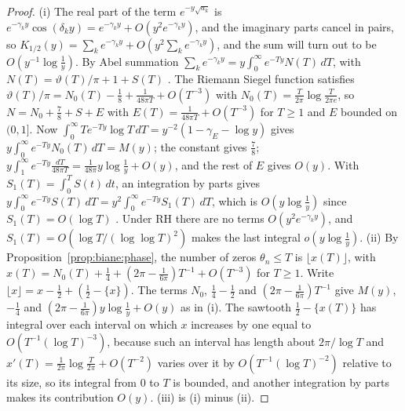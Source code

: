\begin{proof}
(i) The real part of the term $e^{-y\sqrt{a_k}}$ is $e^{-\gamma_ky}\cos(\delta_ky)=e^{-\gamma_ky}+O(y^2e^{-\gamma_ky})$, and the imaginary parts cancel in pairs, so $K_{1/2}(y)=\sum_ke^{-\gamma_ky}+O(y^2\sum_ke^{-\gamma_ky})$, and the sum will turn out to be $O(y^{-1}\log\frac1y)$. By Abel summation $\sum_ke^{-\gamma_ky}=y\int_0^\infty e^{-Ty}N(T)\,dT$, with $N(T)=\vartheta(T)/\pi+1+S(T)$ \cite[Section 9.3]{Titchmarsh}. The Riemann Siegel function satisfies $\vartheta(T)/\pi=N_0(T)-\frac18+\frac1{48\pi T}+O(T^{-3})$ with $N_0(T)=\frac T{2\pi}\log\frac T{2\pi e}$, so $N=N_0+\frac78+S+E$ with $E(T)=\frac1{48\pi T}+O(T^{-3})$ for $T\ge1$ and $E$ bounded on $(0,1]$. Now $\int_0^\infty Te^{-Ty}\log T\,dT=y^{-2}(1-\gamma_E-\log y)$ gives $y\int_0^\infty e^{-Ty}N_0(T)\,dT=M(y)$; the constant gives $\frac78$; $y\int_1^\infty e^{-Ty}\frac{dT}{48\pi T}=\frac1{48\pi}y\log\frac1y+O(y)$, and the rest of $E$ gives $O(y)$. With $S_1(T)=\int_0^TS(t)\,dt$, an integration by parts gives $y\int_0^\infty e^{-Ty}S(T)\,dT=y^2\int_0^\infty e^{-Ty}S_1(T)\,dT$, which is $O(y\log\frac1y)$ since $S_1(T)=O(\log T)$ \cite[Theorem 9.9(A)]{Titchmarsh}. Under RH there are no terms $O(y^2e^{-\gamma_ky})$, and $S_1(T)=O(\log T/(\log\log T)^2)$ \cite[Theorem 14.13]{Titchmarsh} makes the last integral $o(y\log\frac1y)$. (ii) By Proposition~\ref{prop:biane:phase}, the number of zeros $\theta_n\le T$ is $\lfloor x(T)\rfloor$, with $x(T)=N_0(T)+\frac14+(2\pi-\frac1{6\pi})T^{-1}+O(T^{-3})$ for $T\ge1$. Write $\lfloor x\rfloor=x-\frac12+(\frac12-\{x\})$. The terms $N_0$, $\frac14-\frac12$ and $(2\pi-\frac1{6\pi})T^{-1}$ give $M(y)$, $-\frac14$ and $(2\pi-\frac1{6\pi})y\log\frac1y+O(y)$ as in (i). The sawtooth $\frac12-\{x(T)\}$ has integral over each interval on which $x$ increases by one equal to $O(T^{-1}(\log T)^{-3})$, because such an interval has length about $2\pi/\log T$ and $x'(T)=\frac1{2\pi}\log\frac T{2\pi}+O(T^{-2})$ varies over it by $O(T^{-1}(\log T)^{-2})$ relative to its size, so its integral from $0$ to $T$ is bounded, and another integration by parts makes its contribution $O(y)$. (iii) is (i) minus (ii).
\end{proof}

